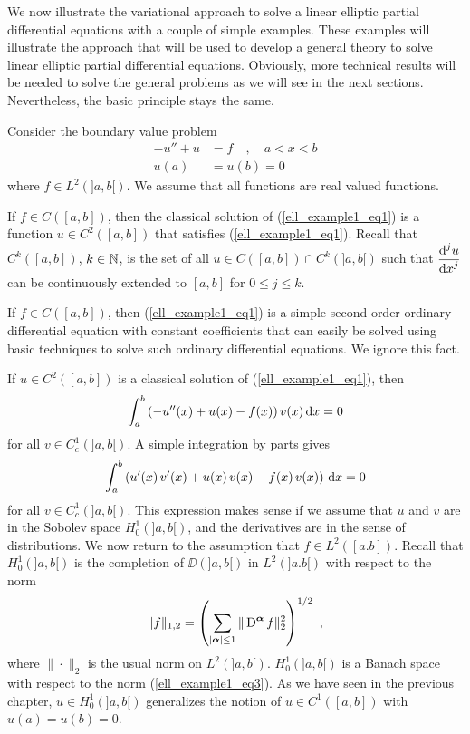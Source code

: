 We now illustrate the variational approach to solve a linear elliptic
partial differential equations with a couple of simple examples.
These examples will illustrate the approach that will be used to
develop a general theory to solve linear elliptic partial differential
equations.  Obviously, more technical results will be needed to
solve the general problems as we will see in the next sections.
Nevertheless, the basic principle stays the same. 

\begin{egg}
Consider the boundary value problem
\begin{equation} \label{ell_example1_eq1}
\begin{split}
- u'' + u &= f  \quad , \quad a < x < b \\
 u(a)&=u(b) = 0
\end{split}
\end{equation}
where $\displaystyle f \in L^2(]a,b[)$.  We assume that all functions are real
valued functions.                   \label{ell_example1}

If $f\in C([a,b])$, then the classical solution of
(\ref{ell_example1_eq1}) is a function $\displaystyle u\in C^2([a,b])$ that
satisfies (\ref{ell_example1_eq1}).  Recall that $\displaystyle C^k([a,b])$,
$k\in \mathbb{N}$, is the set of all
$\displaystyle u \in C([a,b]) \cap C^k(]a,b[)$ such
that $\displaystyle \frac{\displaystyle \mathrm{d}^{j}{u}} {\displaystyle \mathrm{d}{x}^{j}}$ can be continuously extended
to $[a,b]$ for $0 \leq j \leq k$.

If $f\in C([a,b])$, then (\ref{ell_example1_eq1}) is a simple second
order ordinary differential equation with constant coefficients that
can easily be solved using basic techniques to solve such ordinary
differential equations.  We ignore this fact.

If $\displaystyle u \in C^2([a,b])$ is a classical solution of
(\ref{ell_example1_eq1}), then
\[
\int_a^b \left( -u''(x) + u(x) - f(x) \right)v(x)\,\mathrm{d}{x} = 0
\]
for all $\displaystyle v \in C^1_c(]a,b[)$.  A simple integration by parts gives
\[
\int_a^b \left( u'(x)\,v'(x) + u(x)\, v(x) -f(x)\, v(x)
\right) \,\mathrm{d}{x} = 0
\]
for all $\displaystyle v \in C^1_c(]a,b[)$.
This expression makes sense if we assume that
$u$ and $v$ are in the Sobolev space $\displaystyle H_0^{1}(]a,b[)$, and the
derivatives are in the sense of distributions.  We now return to the
assumption that $\displaystyle f \in L^2([a.b])$.  Recall that
$\displaystyle H^1_0(]a,b[)$ is the completion of $\DD(]a,b[)$ in
$\displaystyle L^2(]a.b[)$ with respect to the norm
\begin{equation} \label{ell_example1_eq3}
\| f \|_{1,2} = \left( \sum_{|{\bm{\alpha}}|\leq 1} \| \operatorname{D}^{{\bm{\alpha}}} f \|_2^2
\right)^{1/2} \ ,
\end{equation}
where $\|\cdot\|_2$ is the usual norm on $\displaystyle L^2(]a,b[)$.
$\displaystyle H^1_0(]a,b[)$ is a Banach space with respect to the norm
(\ref{ell_example1_eq3}).  As we have seen in the previous chapter,
$\displaystyle u \in H^1_0(]a,b[)$ generalizes the notion of
$\displaystyle u\in C^1([a,b])$ with $u(a)=u(b)=0$.


\end{egg}
